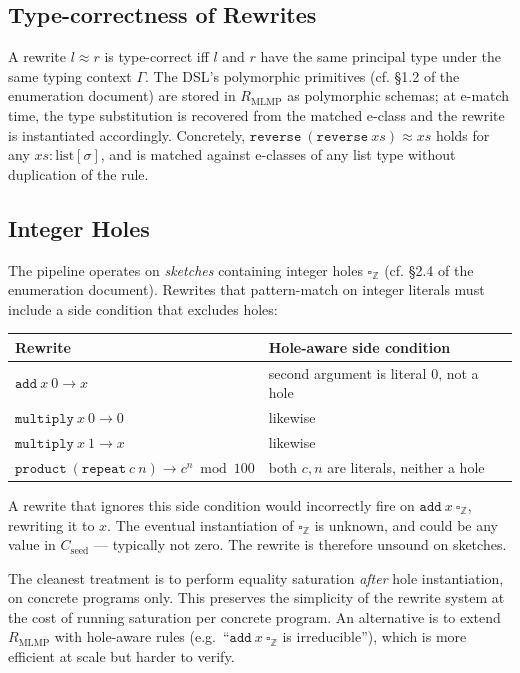 \documentclass[11pt,a4paper]{article}
\begin{document}
\subsection{Type-correctness of Rewrites}\label{sec:type-correctness}

A rewrite $l \approx r$ is type-correct iff $l$ and $r$ have the same principal type under the same typing context $\Gamma$. The DSL's polymorphic primitives (cf. §1.2 of the enumeration document) are stored in $R_{\text{MLMP}}$ as polymorphic schemas; at e-match time, the type substitution is recovered from the matched e-class and the rewrite is instantiated accordingly. Concretely, $\mathtt{reverse}\ (\mathtt{reverse}\ xs) \approx xs$ holds for any $xs : \mathrm{list}[\sigma]$, and is matched against e-classes of any list type without duplication of the rule.

\subsection{Integer Holes}\label{sec:holes-rewrites}

The pipeline operates on \emph{sketches} containing integer holes $\square_{\mathbb{Z}}$ (cf. §2.4 of the enumeration document). Rewrites that pattern-match on integer literals must include a side condition that excludes holes:

\begin{center}
\begin{tabular}{ll}
\toprule
Rewrite & Hole-aware side condition \\
\midrule
$\mathtt{add}\ x\ 0 \to x$ & second argument is literal $0$, not a hole \\
$\mathtt{multiply}\ x\ 0 \to 0$ & likewise \\
$\mathtt{multiply}\ x\ 1 \to x$ & likewise \\
$\mathtt{product}\ (\mathtt{repeat}\ c\ n) \to c^n \bmod 100$ & both $c, n$ are literals, neither a hole \\
\bottomrule
\end{tabular}
\end{center}

A rewrite that ignores this side condition would incorrectly fire on $\mathtt{add}\ x\ \square_{\mathbb{Z}}$, rewriting it to $x$. The eventual instantiation of $\square_{\mathbb{Z}}$ is unknown, and could be any value in $C_{\text{seed}}$ --- typically not zero. The rewrite is therefore unsound on sketches.

The cleanest treatment is to perform equality saturation \emph{after} hole instantiation, on concrete programs only. This preserves the simplicity of the rewrite system at the cost of running saturation per concrete program. An alternative is to extend $R_{\text{MLMP}}$ with hole-aware rules (e.g.\ ``$\mathtt{add}\ x\ \square_{\mathbb{Z}}$ is irreducible''), which is more efficient at scale but harder to verify.
\end{document}

